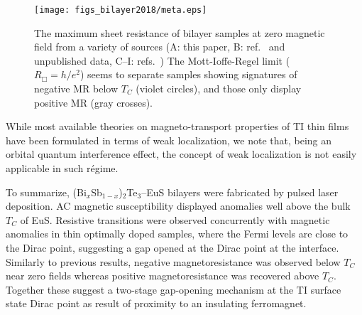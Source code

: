 %
\begin{figure}[ht]%
    \centering
    \texttt{[image: figs\_bilayer2018/meta.eps]}
    \caption[Sheet resistance and signatures of negative magnetoresistance in TI-ferromagnet bilayer samples from literature]{\label{fig:bilayer2018_wl_trend} The maximum sheet resistance of bilayer samples at zero magnetic field from a variety of sources (A: this paper, B: ref.~\protect\cite{bilayer2014} and unpublished data, C--I: refs.~\protect\cite{Samarth2017, Shi2014, Petta2014, Wang2014, Tian2016, Qiu2017}) The Mott-Ioffe-Regel limit ($R_\Box = h/e^2$) seems to separate samples showing signatures of negative MR below $T_C$ (violet circles), and those only display positive MR (gray crosses).}
\end{figure}%
While most available theories on magneto-transport properties of TI thin films have been formulated in terms of weak localization, we note that, being an orbital quantum interference effect, the concept of weak localization is not easily applicable in such r\'egime.

To summarize, (Bi$_x$Sb$_{1-x}$)$_2$Te$_3$--EuS bilayers were fabricated by pulsed laser deposition. AC magnetic susceptibility displayed anomalies well above the bulk $T_C$ of EuS. Resistive transitions were observed concurrently with magnetic anomalies in thin optimally doped samples, where the Fermi levels are close to the Dirac point, suggesting a gap opened at the Dirac point at the interface. Similarly to previous results, negative magnetoresistance was observed below $T_C$ near zero fields whereas positive magnetoresistance was recovered above $T_C$. Together these suggest a two-stage gap-opening mechanism at the TI surface state Dirac point as result of proximity to an insulating ferromagnet.